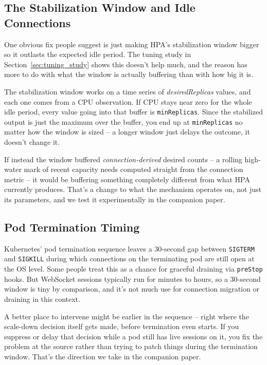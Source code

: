 \documentclass[pdflatex,sn-mathphys-num]{sn-jnl}
\theoremstyle{thmstyleone}%
\theoremstyle{thmstyletwo}%
\theoremstyle{thmstylethree}%
\begin{document}
\subsection{The Stabilization Window and Idle Connections}

One obvious fix people suggest is just making HPA's stabilization window bigger so
it outlasts the expected idle period. The tuning study in
Section~\ref{sec:tuning_study} shows this doesn't help much, and the reason has
more to do with what the window is actually buffering than with how big it is.

The stabilization window works on a time series of \textit{desiredReplicas}
values, and each one comes from a CPU observation. If CPU stays near zero for the
whole idle period, every value going into that buffer is \texttt{minReplicas}.
Since the stabilized output is just the maximum over the buffer, you end up at
\texttt{minReplicas} no matter how the window is sized -- a longer window just
delays the outcome, it doesn't change it.

If instead the window buffered \textit{connection-derived} desired counts -- a
rolling high-water mark of recent capacity needs computed straight from the
connection metric -- it would be buffering something completely different from
what HPA currently produces. That's a change to what the mechanism operates on,
not just its parameters, and we test it experimentally in the companion paper.

\subsection{Pod Termination Timing}

Kubernetes' pod termination sequence leaves a 30-second gap between
\texttt{SIGTERM} and \texttt{SIGKILL} during which connections on the terminating
pod are still open at the OS level. Some people treat this as a chance for
graceful draining via \texttt{preStop} hooks. But WebSocket sessions typically run
for minutes to hours, so a 30-second window is tiny by comparison, and it's not
much use for connection migration or draining in this context.

A better place to intervene might be earlier in the sequence -- right where the
scale-down decision itself gets made, before termination even starts. If you
suppress or delay that decision while a pod still has live sessions on it, you fix
the problem at the source rather than trying to patch things during the
termination window. That's the direction we take in the companion paper.
\end{document}
